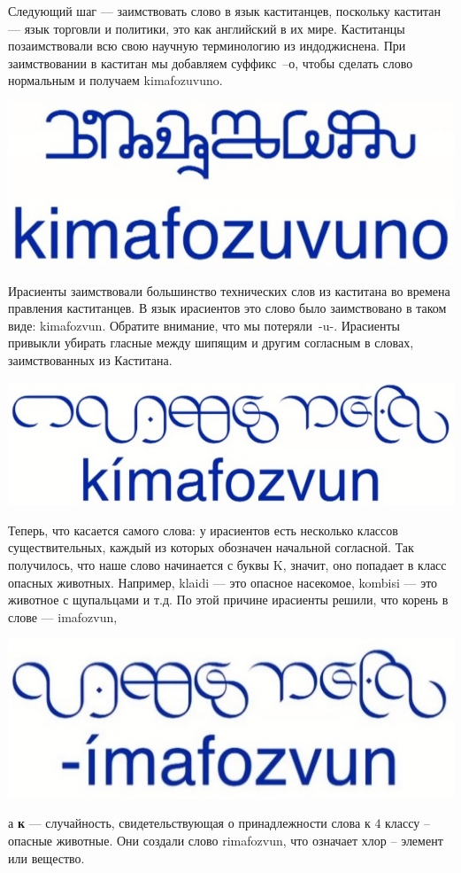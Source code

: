     Следующий шаг — заимствовать слово в язык каститанцев, поскольку каститан — язык торговли и политики, это как английский в их мире. Каститанцы позаимствовали всю свою научную терминологию из индоджиснена. При заимствовании в каститан мы добавляем суффикс~–о, чтобы сделать слово нормальным и получаем kimafozuvuno.
    
    \begin{center}
    \includegraphics[scale=0.2]{lingua/image7-27.jpeg}
    \end{center}
    
    Ирасиенты заимствовали большинство технических слов из каститана во времена правления каститанцев. В язык ирасиентов это слово было заимствовано в таком виде: kimafozvun. Обратите внимание, что мы потеряли~-u-. Ирасиенты привыкли убирать гласные между шипящим и другим согласным в словах, заимствованных из Каститана.
    
    \begin{center}
    \includegraphics[scale=0.2]{lingua/image8-29.jpeg}
    \end{center}
    
    Теперь, что касается самого слова: у ирасиентов есть несколько классов существительных, каждый из которых обозначен начальной согласной. Так получилось, что наше слово начинается с буквы K, значит, оно попадает в класс опасных животных. Например, klaidi — это опасное насекомое, kombisi — это животное с щупальцами и т.д. По этой причине ирасиенты решили, что корень в слове —  imafozvun,
    
    \begin{center}
    \includegraphics[scale=0.2]{lingua/image9-31.jpeg}
    \end{center}
    а \textbf{к} — случайность, свидетельствующая о принадлежности слова к $4$ классу – опасные животные. Они создали слово rimafozvun, что означает хлор – элемент или вещество.
    
